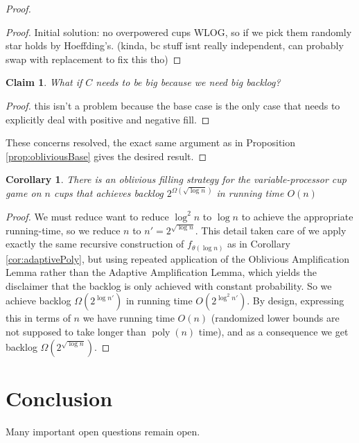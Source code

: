 \documentclass[twocolumn]{article}[10pt]
\DeclareMathOperator{\poly}{\text{poly}}
\newtheorem{clm}{Claim}
\newtheorem{corollary}{Corollary}
\begin{document}
\begin{proof}
\begin{proof}
    Initial solution: no overpowered cups WLOG, so if we pick them randomly star holds
    by Hoeffding's. (kinda, bc stuff isnt really independent, can probably swap
    with replacement to fix this tho)
  
\end{proof}
\begin{clm}
  What if $C$ needs to be big because we need big backlog? 
\end{clm}
\begin{proof}
 this isn't a problem because the base case is the only case that needs to
 explicitly deal with positive and negative fill.
\end{proof}
These concerns resolved, the exact same argument as in Proposition
\ref{prop:obliviousBase} gives the desired result.

\end{proof}

\begin{corollary}
  \label{cor:obliviousPoly}
  There is an oblivious filling strategy for the variable-processor cup game on
  $n$ cups that achieves backlog $2^{\Omega(\sqrt{\log n})}$ in running time
  $O(n)$
\end{corollary}
\begin{proof}
  We must reduce want to reduce $\log^2 n$ to $\log n$ to achieve the
  appropriate running-time, so we reduce $n$ to $n' = 2^{\sqrt{\log n}}$. This
  detail taken care of we apply exactly the same recursive construction of
  $f_{\theta(\log n)}$ as in Corollary \ref{cor:adaptivePoly}, but using
  repeated application of the Oblivious Amplification Lemma rather than the
  Adaptive Amplification Lemma, which yields the disclaimer that the backlog is
  only achieved with constant probability.
  So we achieve backlog $\Omega(2^{\log n'})$ in running time $O(2^{\log^2
  n'})$. By design, expressing this in terms of $n$ we have running time $O(n)$
  (randomized lower bounds are not supposed to take longer than $\poly(n)$
  time), and as a consequence we get backlog $\Omega(2^{\sqrt{\log n}})$.
\end{proof}

\section{Conclusion}
Many important open questions remain open.



\end{document}
